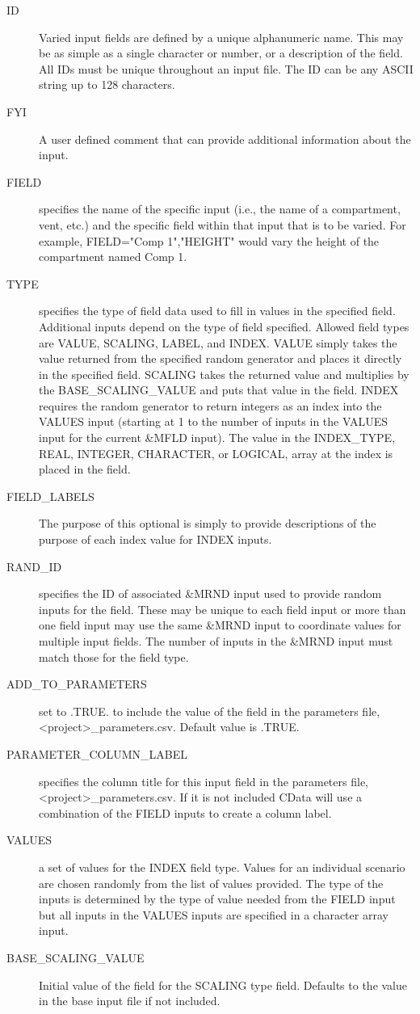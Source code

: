 \documentclass[12pt,twoside]{book}
\begin{document}
\begin{description}
  \item[ID] Varied input fields are defined by a unique alphanumeric name. This may be as simple as a single character or number, or a description of the field. All IDs must be unique throughout an input file.  The { \ct ID} can be any ASCII string up to 128 characters.
  \item[FYI] A user defined comment that can provide additional information about the input.
  \item[FIELD] specifies the name of the specific input (i.e., the name of a compartment, vent, etc.) and the specific field within that input that is to be varied. For example, {\ct FIELD="Comp 1","HEIGHT"} would vary the height of the compartment named {\ct Comp 1}.
  \item[TYPE] specifies the type of field data used to fill in values in the specified field. Additional inputs depend on the type of field specified. Allowed field types are {\ct VALUE}, {\ct SCALING}, {\ct LABEL}, and {\ct INDEX}. {\ct VALUE} simply takes the value returned from the specified random generator and places it directly in the specified field. {\ct SCALING} takes the returned value and multiplies by the {\ct BASE\_SCALING\_VALUE} and puts that value in the field. {\ct INDEX} requires the random generator to return integers as an index into the {\ct VALUES} input (starting at 1 to the number of inputs in the {\ct VALUES}       input for the current {\ct \&MFLD} input). The value in the {\ct INDEX\_TYPE}, {\ct REAL}, {\ct INTEGER}, {\ct CHARACTER}, or {\ct LOGICAL}, array at the index is placed in the field.
  \item[FIELD\_LABELS] The purpose of this optional is simply to provide descriptions of the purpose of each index value for {\ct INDEX} inputs.
  \item[RAND\_ID] specifies the ID of associated {\ct \&MRND} input used to provide random inputs for the field. These may be unique to each field input or more than one field input may use the same {\ct \&MRND} input to coordinate values for multiple input fields. The number of inputs in the {\ct \&MRND} input must match those for the field type.
  \item[ADD\_TO\_PARAMETERS] set to .TRUE. to include the value of the field in the parameters file, {\ct <project>\_parameters.csv}. Default value is .TRUE.
  \item[PARAMETER\_COLUMN\_LABEL] specifies the column title for this input field in the parameters file, {\ct <project>\_parameters.csv}. If it is not included CData will use a combination of the {\ct FIELD} inputs to create a column label.
  \item[VALUES] a set of values for the {\ct INDEX} field type. Values for an individual scenario are chosen randomly from the list of values provided. The type of the inputs is determined by the type of value needed from the {\ct FIELD} input but all inputs in the {\ct VALUES} inputs are specified in a character array input.
  \item[BASE\_SCALING\_VALUE] Initial value of the field for the {\ct SCALING} type field. Defaults to the value in the base input file if not included.
\end{description}
\end{document}
